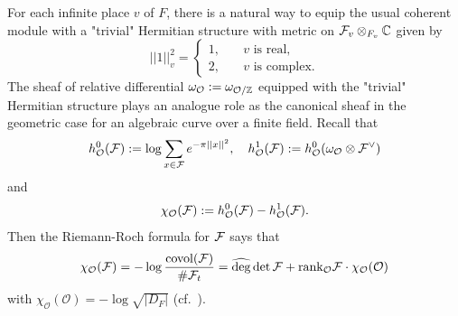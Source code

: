 \documentclass[]{amsart}
\newcommand{\BC}{{\mathbb {C}}} \newcommand{\BD}{{\mathbb {D}}}
\newcommand{\CO}{{\mathcal {O}}} \newcommand{\CP}{{\mathcal {P}}}
\newcommand{\wh}{\widehat}
\theoremstyle{plain}
\theoremstyle{remark} \newtheorem{remark}[thm]{Remark}
\theoremstyle{remark} \newtheorem{exercise}{Exercise}
\theoremstyle{remark} \newtheorem{example}{Example}
\numberwithin{equation}{section}
\begin{document}
For each infinite place $v$ of $F$, there is a natural way to equip the usual coherent module with a "trivial" Hermitian structure with metric on $\CF_v\otimes_{F_v}\BC$ given by \[||1||_v^2=\begin{cases}1,&\quad \text{$v$ is real},\\ 
2,&\quad \text{$v$ is complex}.\end{cases}\]
The sheaf of relative differential $\omega_\CO:=\omega_{\CO/\BZ}$ equipped with the "trivial" Hermitian structure plays an analogue role as the canonical sheaf in the geometric case for an algebraic curve over a finite field. 
Recall that \[h_{\CO}^0(\CF):=\log\sum_{x\in \CF}e^{-\pi ||x||^2},\quad h^1_{\CO}(\CF):=h_{\CO}^0(\omega_{\CO}\otimes \CF^\vee)\] and \begin{equation}\label{rrc1}\chi_\CO(\CF):=h_\CO^0(\CF)-h_\CO^1(\CF).\end{equation}
Then the Riemann-Roch formula for ${\mathcal {F}}$ says that 
\begin{equation}\label{rrc}\chi_\CO(\CF)=-\log\frac{\covol(\CF)}{\#\CF_{t}}=\wh{\deg}\det\CF+\rank_{\CO}\CF \cdot \chi_\CO(\CO)
\end{equation}
with $\chi_\CO(\CO)=-\log\sqrt{|D_F|}$ (cf.~\cite{Geer-Schoof}).
\end{document}
